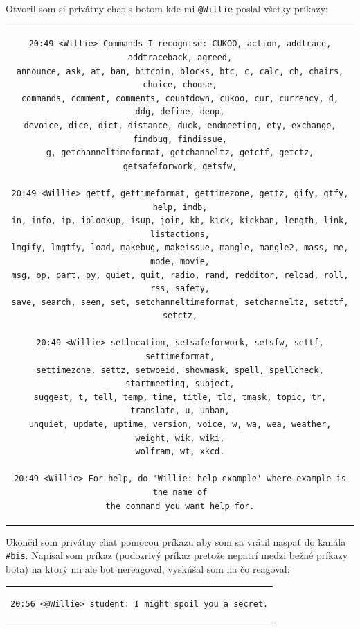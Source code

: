 \documentclass[11pt,a4paper]{article}
\begin{document}
Otvoril som si privátny chat s botom kde mi \texttt{@Willie} poslal všetky príkazy:

\begin{center}
\begin{tabular}{c}
\begin{lstlisting}[language={}, basicstyle=\footnotesize]
20:49 <Willie> Commands I recognise: CUKOO, action, addtrace, addtraceback, agreed,
announce, ask, at, ban, bitcoin, blocks, btc, c, calc, ch, chairs, choice, choose,
commands, comment, comments, countdown, cukoo, cur, currency, d, ddg, define, deop,
devoice, dice, dict, distance, duck, endmeeting, ety, exchange, findbug, findissue,
g, getchanneltimeformat, getchanneltz, getctf, getctz, getsafeforwork, getsfw,

20:49 <Willie> gettf, gettimeformat, gettimezone, gettz, gify, gtfy, help, imdb,
in, info, ip, iplookup, isup, join, kb, kick, kickban, length, link, listactions,
lmgify, lmgtfy, load, makebug, makeissue, mangle, mangle2, mass, me, mode, movie,
msg, op, part, py, quiet, quit, radio, rand, redditor, reload, roll, rss, safety,
save, search, seen, set, setchanneltimeformat, setchanneltz, setctf, setctz,

20:49 <Willie> setlocation, setsafeforwork, setsfw, settf, settimeformat,
settimezone, settz, setwoeid, showmask, spell, spellcheck, startmeeting, subject,
suggest, t, tell, temp, time, title, tld, tmask, topic, tr, translate, u, unban,
unquiet, update, uptime, version, voice, w, wa, wea, weather, weight, wik, wiki,
wolfram, wt, xkcd.

20:49 <Willie> For help, do 'Willie: help example' where example is the name of
the command you want help for.
\end{lstlisting}
\end{tabular}
\end{center}

Ukončil som privátny chat pomocou príkazu  aby som sa vrátil naspať do kanála \texttt{\#bis}. Napísal som príkaz  (podozrivý príkaz pretože nepatrí medzi bežné príkazy bota) na ktorý mi ale bot nereagoval, vyskúšal som  na čo reagoval:

\begin{center}
\begin{tabular}{c}
\begin{lstlisting}[basicstyle=\footnotesize]
20:56 <@Willie> student: I might spoil you a secret.
\end{lstlisting}
\end{tabular}
\end{center}
\end{document}
